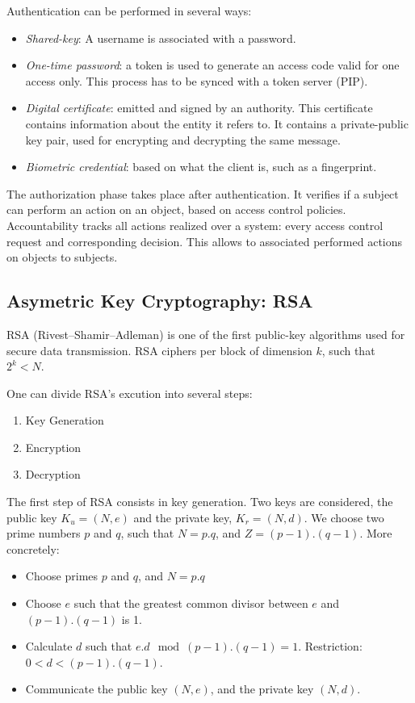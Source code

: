 \documentclass[12pt,a4paper]{article}
\theoremstyle{definition}
\begin{document}
Authentication can be performed in several ways: \begin{itemize}
\item \textit{Shared-key}: A username is associated with a password.
\item \textit{One-time password}: a token is used to generate an access code valid for one access only. This process has to be synced with a token server (PIP).
\item \textit{Digital certificate}: emitted and signed by an authority. This certificate contains information about the entity it refers to. It contains a private-public key pair, used for encrypting and decrypting the same message.
\item \textit{Biometric credential}: based on what the client is, such as a fingerprint.
\end{itemize}

The authorization phase takes place after authentication. It verifies if a subject can perform an action on an object, based on access control policies. Accountability tracks all actions realized over a system: every access control request and corresponding decision. This allows to associated performed actions on objects to subjects.

\subsection{Asymetric Key Cryptography: RSA}
RSA (Rivest–Shamir–Adleman) is one of the first public-key algorithms used for secure data transmission.  RSA ciphers per block of dimension $k$, such that $2^k< N$.

One can divide RSA's excution into several steps:
\begin{enumerate}
\item Key Generation
\item Encryption
\item Decryption
\end{enumerate}

The first step of RSA consists in key generation. Two keys are considered, the public key $K_u = (N,e)$ and the private key, $K_r = (N,d)$. We choose two prime numbers $p$ and $q$, such that $N = p.q$, and $Z = (p - 1).(q - 1)$. More concretely:
\begin{itemize}
\item Choose primes $p$ and $q$, and $N = p.q$
\item Choose $e$ such that the greatest common divisor between $e$ and $(p-1).(q-1)$ is 1.
\item Calculate $d$ such that $e.d \mod (p - 1).(q - 1) = 1$. Restriction: $0 < d < (p - 1).(q - 1)$.
\item Communicate the public key $(N,e)$, and the private key $(N,d)$.
\end{itemize}
\end{document}
